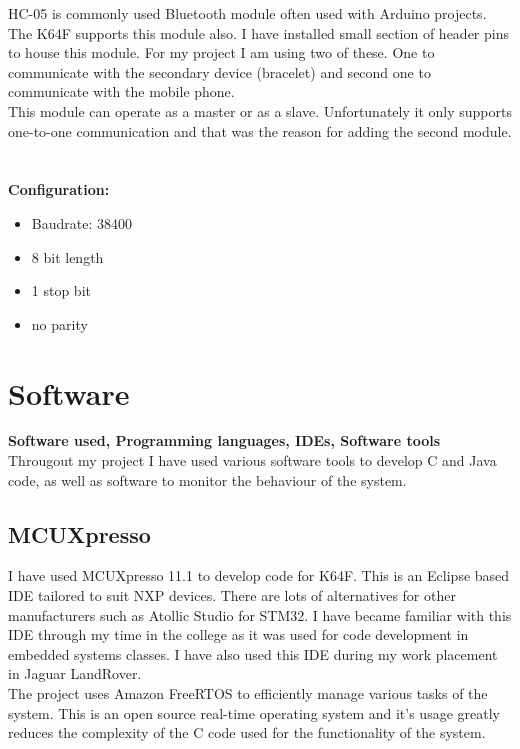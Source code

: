 \documentclass[12pt,a4paper]{article}
\begin{document}
		HC-05 is commonly used Bluetooth module often used with Arduino projects. The K64F supports  
		this module also. I have installed small section of header pins to house this module. For my  
		project I am using two of these. One to communicate with the secondary device (bracelet) and  
		second one to communicate with the mobile phone.\\
		
		This module can operate as a master or as a slave. Unfortunately it only supports one-to-one  
		communication and that was the reason for adding the second module.\\\\\\
		
		{\bfseries Configuration:}
		\begin{itemize}
			\item Baudrate: 38400
			\item 8 bit length
			\item 1 stop bit
			\item no parity

		\end{itemize}
		\newpage
		
	\section{Software}
	{\bfseries Software used, Programming languages, IDEs, Software tools}\\
	Througout my project I have used various software tools to develop C and Java code, as well as
	software to monitor the behaviour of the system.
	
		\subsection{MCUXpresso}
		I have used MCUXpresso 11.1 to develop code for K64F. This is an Eclipse based IDE tailored  
		to suit NXP devices. There are lots of alternatives for other manufacturers such as Atollic Studio for STM32. I have became familiar with this IDE through my time in the college as it 
		was used for code development in embedded systems classes. I have also used this IDE during my work placement in Jaguar LandRover.\\
		
		The project uses Amazon FreeRTOS to efficiently manage various tasks of the system. This is an open source real-time operating system and it's usage greatly reduces the complexity of  
		the C code used for the functionality of the system.    
		\newpage
	
\end{document}
